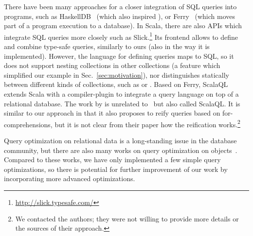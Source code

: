 There have been many approaches for a closer integration of SQL queries into programs, such as
HaskellDB~\citep{Leijen99DSEC} (which also inspired \LINQ), or Ferry~\citep{Grust:2009:FDP:1559845.1559982} 
(which moves part of a program execution to a database). In Scala, there are also
APIs which integrate SQL queries more closely such as
Slick.\footnote{\url{http://slick.typesafe.com/}} Its frontend allows to define
and combine type-safe queries, similarly to ours (also in the way it is
implemented).
However, the language for defining queries maps to SQL, so it does not support nesting collections
in other collections (a feature which simplified our example in
Sec.~\ref{sec:motivation}), nor distinguishes statically between different kinds of
collections, such as  or .
Based on Ferry, ScalaQL~\citep{JOT:issue_2010_07/article3} extends Scala with a compiler-plugin to integrate a query language on top of a relational database. The work by \citet{Spiewak09scalaql:language-integrated} is
 unrelated to~\citep{JOT:issue_2010_07/article3} but also called ScalaQL\@. It is similar to our approach in that it also 
proposes to reify queries based on for-comprehensions, but it is not clear from their paper how the reification
works.\footnote{We contacted the authors; they were not willing to provide more details or the sources of their approach.}


Query optimization on relational data is a long-standing issue in the database community, but there
are also many works on query optimization on objects~\citep{Fegaras00,Grust99PhD}.
Compared to these works, we have only implemented a few simple query optimizations, so there is potential
for further improvement of our work by incorporating more advanced optimizations.




